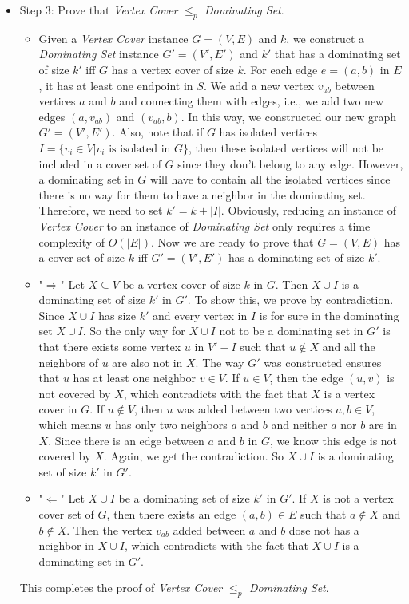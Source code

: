 \documentclass{article}
\begin{document}
\begin{tcolorbox}
\begin{itemize}
\item Step 3: Prove that  {\em Vertex Cover}  $ \leq_{p}$ {\em Dominating Set}.
\begin{itemize}
\item Given a {\em Vertex Cover} instance  $G = (V, E)$ and $k$, we construct a {\em Dominating Set} instance $G' = (V', E')$ and $k'$ that has a dominating set of size $k'$ iff $G$ has a vertex cover of size $k$. For each edge $e = (a,b)$ in $E$, it has at least one endpoint in $S$. We add a new vertex $v_{ab}$ between vertices $a$ and $b$ and connecting them with edges, i.e., we add two new edges $(a, v_{ab})$ and $(v_{ab}, b)$. In this way, we constructed our new graph $G' = (V', E')$. Also, note that if $G$ has isolated vertices $I = \{ v_i \in V | v_i \text{ is isolated in } G\}$, then these isolated vertices will not be included in a cover set of $G$ since they don't belong to any edge. However, a dominating set in $G$ will have to contain all the isolated vertices since there is no way for them to have a neighbor in the dominating set. Therefore, we need to set $k' = k + |I|$. Obviously, reducing an instance of {\em Vertex Cover} to an instance of {\em Dominating Set} only requires a time complexity of $O(|E|)$. Now we are ready to prove that $G = (V, E)$ has a cover set of size $k$ iff $G' = (V', E')$ has a dominating set of size $k'$.

\item "$\Rightarrow$" Let $X \subseteq V$ be a vertex cover of size $k$ in $G$. Then  $X \cup I $ is a dominating set of size $k'$ in $G'$. To show this, we prove by contradiction. Since $X \cup I $ has size $k'$ and every vertex in $I$ is for sure in the dominating set $X \cup I$. So the only way for $X \cup I $ not to be a dominating set in $G'$ is that there exists some vertex $u$ in $V' - I$ such that $u \notin X$ and all the neighbors of $u$ are also not in $X$. The way $G'$ was constructed ensures that $u$ has at least one neighbor $v \in V$. If  $u \in V$, then the edge $(u, v)$ is not covered by $X$, which contradicts with the fact that $X$ is a vertex cover in $G$. If $u \notin V$, then $u$ was added between two vertices $a, b \in V$, which means $u$ has only two neighbors $a$ and $b$ and neither $a$ nor $b$ are in $X$. Since there is an edge between $a$ and $b$ in $G$, we know this edge is not covered by $X$. Again, we get the contradiction. So $X \cup I $ is a dominating set of size $k'$ in $G'$. 

\item "$\Leftarrow$" Let  $X \cup I $ be a dominating set of size $k'$ in $G'$. If $X$ is not a vertex cover set of $G$, then there exists an edge $(a,b) \in E$ such that $a \notin X$ and $b \notin X$. Then the vertex $v_{ab}$ added between $a$ and $b$ dose not has a neighbor in $X \cup I$, which contradicts with the fact that $X \cup I$ is a dominating set in $G'$.
\end{itemize}
This completes the proof of {\em Vertex Cover}  $ \leq_{p}$ {\em Dominating Set}.
\end{itemize}
\end{tcolorbox}
\newpage
\end{document}

